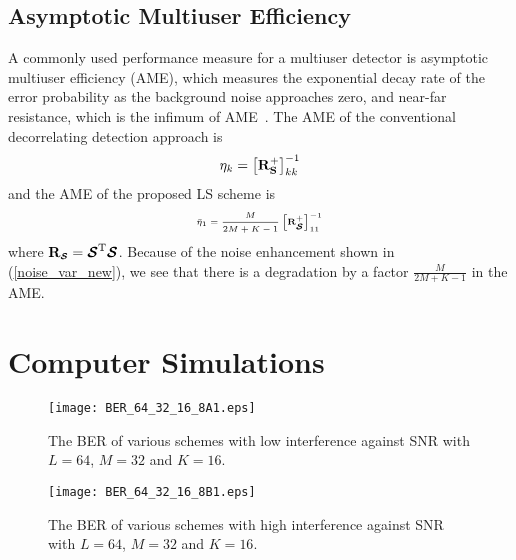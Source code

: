\documentclass[conference]{IEEEtran}
\newcommand{\bS}{{\bf S}}
\newcommand{\bR}{{\bf R}}
\newcommand{\bcS}{{\mbox {\boldmath ${\cal S}$}}}
\begin{document}
\subsection{Asymptotic Multiuser Efficiency}

A commonly used performance measure for a multiuser detector is
asymptotic multiuser efficiency (AME), which measures the
exponential decay rate of the error probability as the background
noise approaches zero, and near-far resistance, which is the
infimum of AME~\cite{Verd98}. The AME of the conventional
decorrelating detection approach is
\begin{equation}
{\eta}_k = \left[\bR_{\bS}^{+}\right]_{kk}^{-1}
\end{equation}
and the AME of the proposed LS scheme is
\begin{equation}
{{\bar{\eta}}_1} = \frac{M}{2M+K-1}\left[\bR_{\tiny\bcS}^{+}\right]_{11}^{-1}
\end{equation}
where $\bR_{\tiny\bcS}=\bcS^{\rm T}\bcS$.  Because of the noise enhancement shown in
(\ref{noise_var_new}), we see that there is a degradation by a factor
${\frac{M}{2M+K-1}}$ in the  AME.

\section{Computer Simulations}

\begin{figure}
\centerline{\texttt{[image: BER\_64\_32\_16\_8A1.eps]}}
\caption{ The BER of various schemes with low interference against
SNR with $L=64$, $M=32$ and $K=16$.} \label{BER1}
\end{figure}

\begin{figure}
\centerline{\texttt{[image: BER\_64\_32\_16\_8B1.eps]}}
\caption{ The BER of various schemes with high interference
against SNR with $L=64$, $M=32$ and $K=16$.} \label{BER2}
\end{figure}
\end{document}
